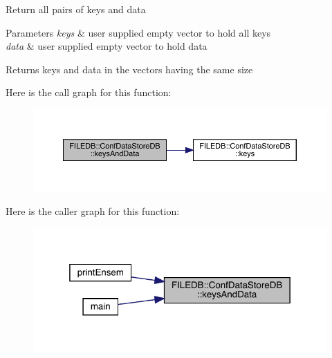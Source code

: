 Return all pairs of keys and data 
\begin{DoxyParams}{Parameters}
{\em keys} & user supplied empty vector to hold all keys \\
\hline
{\em data} & user supplied empty vector to hold data \\
\hline
\end{DoxyParams}
\begin{DoxyReturn}{Returns}
keys and data in the vectors having the same size 
\end{DoxyReturn}
Here is the call graph for this function\+:
\nopagebreak
\begin{figure}[H]
\begin{center}
\leavevmode
\includegraphics[width=350pt]{d8/d19/classFILEDB_1_1ConfDataStoreDB_a94333e6aab463fd336bffb28d81dd39d_cgraph}
\end{center}
\end{figure}
Here is the caller graph for this function\+:\nopagebreak
\begin{figure}[H]
\begin{center}
\leavevmode
\includegraphics[width=319pt]{d8/d19/classFILEDB_1_1ConfDataStoreDB_a94333e6aab463fd336bffb28d81dd39d_icgraph}
\end{center}
\end{figure}
\mbox{\label{classFILEDB_1_1ConfDataStoreDB_a94333e6aab463fd336bffb28d81dd39d}} 
